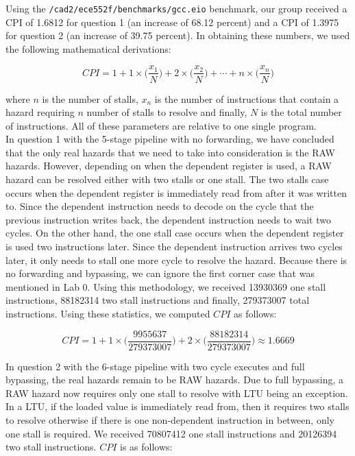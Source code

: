 \documentclass[12pt]{article}
\begin{document}
\begin{singlespace}

Using the \texttt{/cad2/ece552f/benchmarks/gcc.eio} benchmark, our group received a CPI of 1.6812 for question 1 (an increase of 68.12 percent) and a CPI of 1.3975 for question 2 (an increase of 39.75 percent). In obtaining these numbers, we used the following mathematical derivations:

$$
CPI = 1+1\times\Big(\frac{x_{1}}{N}\Big)+2\times\Big(\frac{x_{2}}{N}\Big)+\cdots+n\times\Big(\frac{x_{n}}{N}\Big)
$$

where $n$ is the number of stalls, $x_{n}$ is the number of instructions that contain a hazard requiring $n$ number of stalls to resolve and finally, $N$ is the total number of instructions. All of these parameters are relative to one single program.\\

In question 1 with the 5-stage pipeline with no forwarding, we have concluded that the only real hazards that we need to take into consideration is the RAW hazards. However, depending on when the dependent register is used, a RAW hazard can be resolved either with two stalls or one stall. The two stalls case occurs when the dependent register is immediately read from after it was written to. Since the dependent instruction needs to decode on the cycle that the previous instruction writes back, the dependent instruction needs to wait two cycles. On the other hand, the one stall case occurs when the dependent register is used two instructions later. Since the dependent instruction arrives two cycles later, it only needs to stall one more cycle to resolve the hazard. Because there is no forwarding and bypassing, we can ignore the first corner case that was mentioned in Lab 0. Using this methodology, we received 13930369 one stall instructions, 88182314 two stall instructions and finally, 279373007 total instructions. Using these statistics, we computed $CPI$ as follows:

$$
CPI = 1+1\times\Big(\frac{9955637}{279373007}\Big)+2\times\Big(\frac{88182314}{279373007}\Big)
    \approx 1.6669
$$

In question 2 with the 6-stage pipeline with two cycle executes and full bypassing, the real hazards remain to be RAW hazards. Due to full bypassing, a RAW hazard now requires only one stall to resolve with LTU being an exception. In a LTU, if the loaded value is immediately read from, then it requires two stalls to resolve otherwise if there is one non-dependent instruction in between, only one stall is required. We received 70807412 one stall instructions and 20126394 two stall instructions. $CPI$ is as follows:


\end{singlespace}
\end{document}
